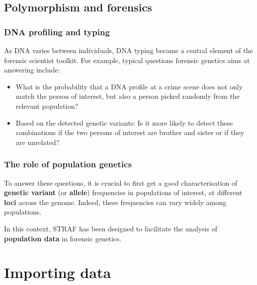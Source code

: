 \documentclass[
]{book}
\begin{document}
\hypertarget{polymorphism-and-forensics}{%
\section*{Polymorphism and forensics}\label{polymorphism-and-forensics}}

\hypertarget{dna-profiling-and-typing}{%
\subsection*{DNA profiling and typing}\label{dna-profiling-and-typing}}

As DNA varies between individuals, DNA typing became a central element of the forensic
scientist toolkit. For example, typical questions forensic genetics aims at
answering include:

\begin{itemize}
\item
  What is the probability that a DNA profile at a crime scene does not only match the person of interest, but also a person picked randomly from the relevant population?
\item
  Based on the detected genetic variants: Is it more likely to detect these combinations if the two persons of interest are brother and sister or if they are unrelated?
\end{itemize}

\hypertarget{the-role-of-population-genetics}{%
\subsection*{The role of population genetics}\label{the-role-of-population-genetics}}

To answer these questions, it is crucial to first get a good characterisation
of \textbf{genetic variant} (or \textbf{allele}) frequencies in populations of interest,
at different \textbf{loci} across the genome. Indeed, these frequencies can vary
widely among populations.

In this context, STRAF has been designed to facilitate the analysis of
\textbf{population data} in forensic genetics.

\hypertarget{importing-data}{%
\chapter{Importing data}\label{importing-data}}
\end{document}
